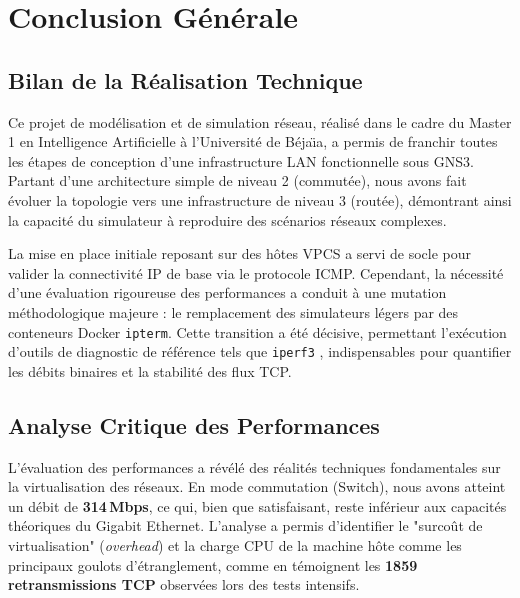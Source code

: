 \documentclass[11pt,a4paper,oneside]{report}
\begin{document}
\chapter{Conclusion G\'{e}n\'{e}rale}

\section{Bilan de la R\'{e}alisation Technique}

Ce projet de mod\'{e}lisation et de simulation r\'{e}seau, r\'{e}alis\'{e} dans le cadre du Master 1 en Intelligence Artificielle \`{a} l'Universit\'{e} de B\'{e}ja\"{\i}a, a permis de franchir toutes les \'{e}tapes de conception d'une infrastructure LAN fonctionnelle sous GNS3. Partant d'une architecture simple de niveau 2 (commut\'{e}e), nous avons fait \'{e}voluer la topologie vers une infrastructure de niveau 3 (rout\'{e}e), d\'{e}montrant ainsi la capacit\'{e} du simulateur \`{a} reproduire des sc\'{e}narios r\'{e}seaux complexes.

La mise en place initiale reposant sur des h\^{o}tes VPCS a servi de socle pour valider la connectivit\'{e} IP de base via le protocole ICMP. Cependant, la n\'{e}cessit\'{e} d'une \'{e}valuation rigoureuse des performances a conduit \`{a} une mutation m\'{e}thodologique majeure : le remplacement des simulateurs l\'{e}gers par des conteneurs Docker \texttt{ipterm}. Cette transition a \'{e}t\'{e} d\'{e}cisive, permettant l'ex\'{e}cution d'outils de diagnostic de r\'{e}f\'{e}rence tels que \texttt{iperf3}
, indispensables pour quantifier les d\'{e}bits binaires et la stabilit\'{e} des flux TCP.

\section{Analyse Critique des Performances}

L'\'{e}valuation des performances a r\'{e}v\'{e}l\'{e} des r\'{e}alit\'{e}s techniques fondamentales sur la virtualisation des r\'{e}seaux. En mode commutation (Switch), nous avons atteint un d\'{e}bit de \textbf{314\,Mbps}, ce qui, bien que satisfaisant, reste inf\'{e}rieur aux capacit\'{e}s théoriques du Gigabit Ethernet. L'analyse a permis d'identifier le "surco\^{u}t de virtualisation" (\textit{overhead}) et la charge CPU de la machine h\^{o}te comme les principaux goulots d'\'{e}tranglement, comme en t\'{e}moignent les \textbf{1859 retransmissions TCP} observ\'{e}es lors des tests intensifs.
\end{document}
